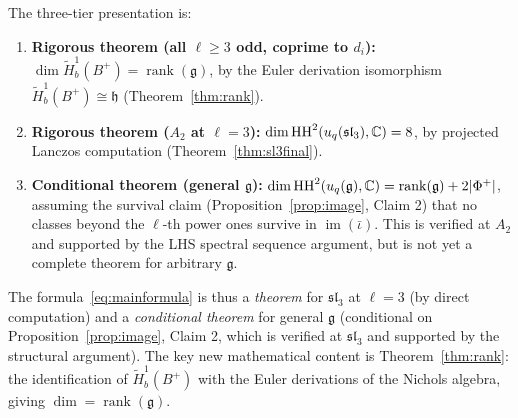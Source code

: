 The three-tier presentation is:
\begin{enumerate}
\item \textbf{Rigorous theorem (all $\ell \geq 3$ odd, coprime to $d_i$):} $\dim \tilde{H}^1_b(B^+) = \operatorname{rank}(\mathfrak{g})$, by the Euler derivation isomorphism $\tilde{H}^1_b(B^+) \cong \mathfrak{h}$ (Theorem~\ref{thm:rank}).
\item \textbf{Rigorous theorem ($A_2$ at $\ell = 3$):} $\dim \operatorname{HH}^2(u_q(\mathfrak{sl}_3), \mathbb{C}) = 8$, by projected Lanczos computation (Theorem~\ref{thm:sl3final}).
\item \textbf{Conditional theorem (general $\mathfrak{g}$):} $\dim \operatorname{HH}^2(u_q(\mathfrak{g}), \mathbb{C}) = \operatorname{rank}(\mathfrak{g}) + 2|\Phi^+|$, assuming the survival claim (Proposition~\ref{prop:image}, Claim 2) that no classes beyond the $\ell$-th power ones survive in $\operatorname{im}(\bar\iota)$. This is verified at $A_2$ and supported by the LHS spectral sequence argument, but is not yet a complete theorem for arbitrary $\mathfrak{g}$.
\end{enumerate}

The formula~\eqref{eq:mainformula} is thus a \emph{theorem} for $\mathfrak{sl}_3$ at $\ell = 3$ (by direct computation) and a \emph{conditional theorem} for general $\mathfrak{g}$ (conditional on Proposition~\ref{prop:image}, Claim 2, which is verified at $\mathfrak{sl}_3$ and supported by the structural argument). The key new mathematical content is Theorem~\ref{thm:rank}: the identification of $\tilde{H}^1_b(B^+)$ with the Euler derivations of the Nichols algebra, giving $\dim = \operatorname{rank}(\mathfrak{g})$.
